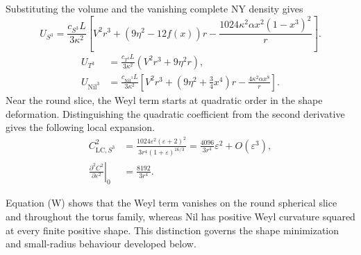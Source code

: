 Substituting the volume and the vanishing complete NY density gives
\begin{equation}
U_{S^3}=\frac{c_{S^3}L}{3\kappa^2}
\left[V^2r^3+(9\eta^2-12f(x))r
-\frac{1024\kappa^2\alpha x^2(1-x^3)^2}{r}\right].
\tag{S3}\label{eq:S3}
\end{equation}
\begin{equation}
\begin{aligned}
U_{T^3}&=\frac{c_{T^3}L}{3\kappa^2}(V^2r^3+9\eta^2r),\\
U_{\mathrm{Nil}^3}&=\frac{c_{\mathrm{Nil}^3}L}{3\kappa^2}
\left[V^2r^3+\left(9\eta^2+\frac34x^4\right)r
-\frac{4\kappa^2\alpha x^8}{r}\right].
\end{aligned}
\tag{TN}\label{eq:TN}
\end{equation}
Near the round slice, the Weyl term starts at quadratic order in the shape deformation. Distinguishing the quadratic coefficient from the second derivative gives the following local expansion.
\begin{equation}
\begin{aligned}
C_{\mathrm{LC},S^3}^2
&=\frac{1024\varepsilon^2(\varepsilon+2)^2}{3r^4(1+\varepsilon)^{16/3}}
=\frac{4096}{3r^4}\varepsilon^2+O(\varepsilon^3),\\
\left.\frac{\partial^2 C^2}{\partial\varepsilon^2}\right|_0
&=\frac{8192}{3r^4}.
\end{aligned}
\tag{DERIV}\label{eq:DERIV}
\end{equation}


Equation (W) shows that the Weyl term vanishes on the round spherical slice and throughout the torus family, whereas Nil has positive Weyl curvature squared at every finite positive shape. This distinction governs the shape minimization and small-radius behaviour developed below.

